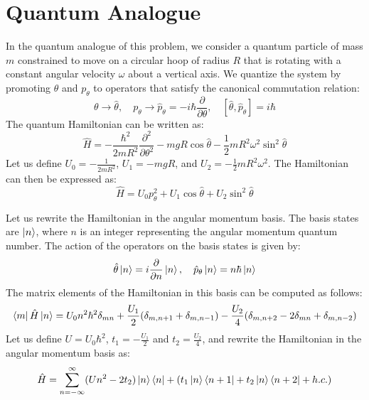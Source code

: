 \documentclass{article}
\begin{document}
\section{Quantum Analogue}
In the quantum analogue of this problem, we consider a quantum particle of mass $m$ constrained to move on a circular hoop of radius $R$ that is rotating with a constant angular velocity $\omega$ about a vertical axis. 
We quantize the system by promoting $\theta$ and $p_\theta$ to operators that satisfy the canonical commutation relation:
\begin{equation}
    \theta \to \hat{\theta}, \quad p_\theta \to \hat{p}_\theta = -i\hbar \frac{\partial}{\partial \theta}, \quad [\hat{\theta}, \hat{p}_\theta] = i\hbar
\end{equation}
The quantum Hamiltonian can be written as:
\begin{equation}
\hat{H} = -\frac{\hbar^2}{2mR^2} \frac{\partial^2}{\partial \theta^2} - mgR \cos\hat{\theta} - \frac{1}{2} m R^2 \omega^2 \sin^2\hat{\theta} \label{quantum Hamiltonian}
\end{equation}
Let us define $U_0 = -\frac{1}{2 m R^2}$, $U_1 = -mgR$, and $U_2 = -\frac{1}{2} m R^2 \omega^2$.
The Hamiltonian can then be expressed as:
\begin{equation}
\hat{H} = U_0 p_\theta^2+ U_1 \cos\hat{\theta} + U_2 \sin^2\hat{\theta}
\end{equation}

\newpage
Let us rewrite the Hamiltonian in the angular momentum basis. The basis states are $\ket{n}$, where $n$ is an integer representing the angular momentum quantum number.
The action of the operators on the basis states is given by:
\begin{equation}
\hat{\theta} \ket{n} = i \frac{\partial}{\partial n} \ket{n}, \quad \hat{p}_\theta \ket{n} = n \hbar \ket{n}
\end{equation}
The matrix elements of the Hamiltonian in this basis can be computed as follows:
\begin{equation}
\bra{m} \hat{H} \ket{n} = U_0 n^2 \hbar^2 \delta_{mn} + \frac{U_1}{2} (\delta_{m,n+1} + \delta_{m,n-1}) - \frac{U_2}{4} (\delta_{m,n+2} - 2\delta_{mn} + \delta_{m,n-2})
\end{equation}
Let us define $U= U_0 \hbar^2$, $t_1 = -\frac{U_1}{2}$ and $t_2 = \frac{U_2}{4}$, and rewrite the Hamiltonian in the angular momentum basis as:
\begin{equation}
\hat{H} = \sum_{n=-\infty}^{\infty}  (U n^2 - 2 t_2)  \ket{n}\bra{n} +  (t_1 \ket{n}\bra{n+1} + t_2 \ket{n}\bra{n+2} + h.c. )
\end{equation}
\end{document}
